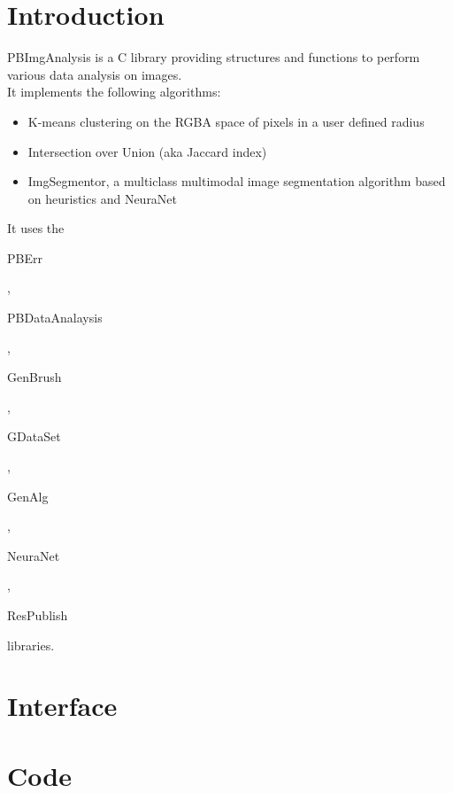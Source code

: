 \section*{Introduction}

PBImgAnalysis is a C library providing structures and functions to perform various data analysis on images.\\ 

It implements the following algorithms:
\begin{itemize}
\item K-means clustering on the RGBA space of pixels in a user defined radius
\item Intersection over Union (aka Jaccard index)
\item ImgSegmentor, a multiclass multimodal image segmentation algorithm based on heuristics and NeuraNet
\end{itemize}

It uses the \begin{ttfamily}PBErr\end{ttfamily}, \begin{ttfamily}PBDataAnalaysis\end{ttfamily}, \begin{ttfamily}GenBrush\end{ttfamily}, \begin{ttfamily}GDataSet\end{ttfamily}, \begin{ttfamily}GenAlg\end{ttfamily}, \begin{ttfamily}NeuraNet\end{ttfamily}, \begin{ttfamily}ResPublish\end{ttfamily} libraries.\\

\section{Interface}

\begin{scriptsize}
\begin{ttfamily}

\end{ttfamily}
\end{scriptsize}

\section{Code}

